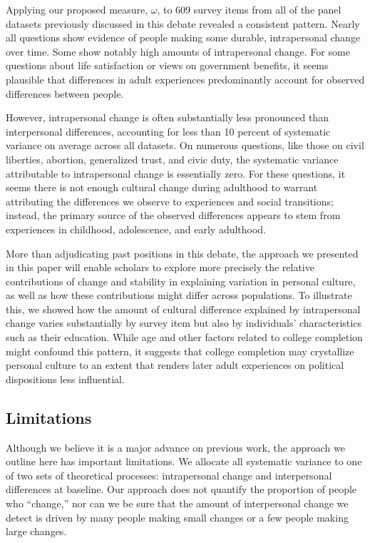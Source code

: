 \documentclass[
  12pt,
]{article}
\begin{document}
Applying our proposed measure, \(\omega\), to 609 survey items from all
of the panel datasets previously discussed in this debate revealed a
consistent pattern. Nearly all questions show evidence of people making
some durable, intrapersonal change over time. Some show notably high
amounts of intrapersonal change. For some questions about life
satisfaction or views on government benefits, it seems plausible that
differences in adult experiences predominantly account for observed
differences between people.

However, intrapersonal change is often substantially less pronounced
than interpersonal differences, accounting for less than 10 percent of
systematic variance on average across all datasets. On numerous
questions, like those on civil liberties, abortion, generalized trust,
and civic duty, the systematic variance attributable to intrapersonal
change is essentially zero. For these questions, it seems there is not
enough cultural change during adulthood to warrant attributing the
differences we observe to experiences and social transitions; instead,
the primary source of the observed differences appears to stem from
experiences in childhood, adolescence, and early adulthood.

More than adjudicating past positions in this debate, the approach we
presented in this paper will enable scholars to explore more precisely
the relative contributions of change and stability in explaining
variation in personal culture, as well as how these contributions might
differ across populations. To illustrate this, we showed how the amount
of cultural difference explained by intrapersonal change varies
substantially by survey item but also by individuals' characteristics
such as their education. While age and other factors related to college
completion might confound this pattern, it suggests that college
completion may crystallize personal culture to an extent that renders
later adult experiences on political dispositions less influential.

\hypertarget{limitations}{%
\subsection{Limitations}\label{limitations}}

Although we believe it is a major advance on previous work, the approach
we outline here has important limitations. We allocate all systematic
variance to one of two sets of theoretical processes: intrapersonal
change and interpersonal differences at baseline. Our approach does not
quantify the proportion of people who ``change,'' nor can we be sure
that the amount of interpersonal change we detect is driven by many
people making small changes or a few people making large changes.
\end{document}
